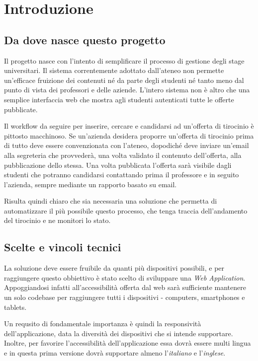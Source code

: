 \chapter{Introduzione}

\section{Da dove nasce questo progetto}

Il progetto \projectName nasce con l'intento di semplificare il processo di gestione degli stage universitari. Il sistema correntemente adottato dall'ateneo non permette un'efficace fruizione dei contenuti né da parte degli studenti né tanto meno dal punto di vista dei professori e delle aziende. L'intero sistema non è altro che una semplice interfaccia web che mostra agli studenti autenticati tutte le offerte pubblicate.

Il workflow da seguire per inserire, cercare e candidarsi ad un'offerta di tirocinio è pittosto macchinoso. Se un'azienda desidera proporre un'offerta di tirocinio prima di tutto deve essere convenzionata con l'ateneo, dopodiché deve inviare un'email alla segreteria che provvederà, una volta validato il contenuto dell'offerta, alla pubblicazione dello stessa. Una volta pubblicata l'offerta sarà visibile dagli studenti che potranno candidarsi contattando prima il professore e in seguito l'azienda, sempre mediante un rapporto basato su email. 

Risulta quindi chiaro che sia necessaria una soluzione che permetta di automatizzare il più possibile questo processo, che tenga traccia dell'andamento del tirocinio e ne monitori lo stato.



\section{Scelte e vincoli tecnici} 

La soluzione deve essere fruibile da quanti più dispositivi possibili, e per raggiungere questo obbiettivo è stato scelto di sviluppare una \textit{Web Application}. Appoggiandosi infatti all'accessibilità offerta dal web sarà sufficiente mantenere un solo codebase per raggiungere tutti i dispositivi - computers, smartphones e tablets.

Un requsito di fondamentale importanza è quindi la responsività dell'applicazione, data la diversità dei dispositivi che si intende supportare. 
Inoltre, per favorire l'accessibilità dell'applicazione essa dovrà essere multi lingua e in questa prima versione dovrà supportare almeno l'\textit{italiano} e l'\textit{inglese}.

